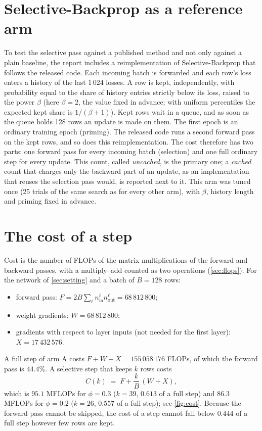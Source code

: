 \section{Selective-Backprop as a reference arm}\label{sec:sb}
To test the selective pass against a published method and not only against a plain baseline, the report includes a reimplementation of Selective-Backprop \citep{jiang2019selective} that follows the released code. Each incoming batch is forwarded and each row's loss enters a history of the last 1\,024 losses. A row is kept, independently, with probability equal to the share of history entries strictly below its loss, raised to the power $\beta$ (here $\beta=2$, the value fixed in advance; with uniform percentiles the expected kept share is $1/(\beta+1)$). Kept rows wait in a queue, and as soon as the queue holds 128 rows an update is made on them. The first epoch is an ordinary training epoch (priming). The released code runs a second forward pass on the kept rows, and so does this reimplementation. The cost therefore has two parts: one forward pass for every incoming batch (selection) and one full ordinary step for every update. This count, called \emph{uncached}, is the primary one; a \emph{cached} count that charges only the backward part of an update, as an implementation that reuses the selection pass would, is reported next to it. This arm was tuned once (25 trials of the same search as for every other arm), with $\beta$, history length and priming fixed in advance.

\section{The cost of a step}\label{sec:cost-model}
Cost is the number of FLOPs of the matrix multiplications of the forward and backward passes, with a multiply--add counted as two operations (\cref{sec:flops}). For the network of \cref{sec:setting} and a batch of $B=128$ rows:
\begin{itemize}
\item forward pass: $F=2B\sum_\ell n^\ell_{\mathrm{in}}n^\ell_{\mathrm{out}} = 68\,812\,800$;
\item weight gradients: $W=68\,812\,800$;
\item gradients with respect to layer inputs (not needed for the first layer): $X=17\,432\,576$.
\end{itemize}
A full step of arm A costs $F+W+X=155\,058\,176$ FLOPs, of which the forward pass is $44.4\%$. A selective step that keeps $k$ rows costs
\begin{equation}
C(k) \;=\; F + \frac{k}{B}\,(W+X),
\end{equation}
which is $95.1$ MFLOPs for $\phi=0.3$ ($k=39$, $0.613$ of a full step) and $86.3$ MFLOPs for $\phi=0.2$ ($k=26$, $0.557$ of a full step); see \cref{fig:cost}. Because the forward pass cannot be skipped, the cost of a step cannot fall below $0.444$ of a full step however few rows are kept.


